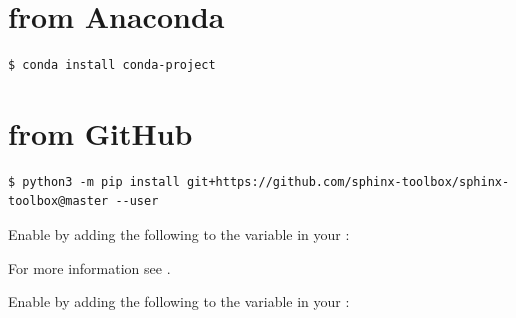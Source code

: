 \documentclass[letterpaper,10pt,english]{sphinxmanual}
\begin{document}
\chapter{from Anaconda}
\label{\detokenize{installation:installation-17-from_Anaconda}}
\begin{Verbatim}[commandchars=\\\{\}]
$ conda install conda-project
\end{Verbatim}


\chapter{from GitHub}
\label{\detokenize{installation:installation-17-from_GitHub}}
\begin{Verbatim}[commandchars=\\\{\}]
$ python3 -m pip install git+https://github.com/sphinx-toolbox/sphinx-toolbox@master --user
\end{Verbatim}

\label{\detokenize{installation:extensions-0}}

\vspace{10px}

Enable  by adding the following
to the  variable in your :

\begin{sphinxVerbatim}[commandchars=\\\{\}]
  \PYG{p}{[}
    \PYG{p}{]}
\end{sphinxVerbatim}
\begin{flushleft}
For more information see  .
\end{flushleft}

\label{\detokenize{installation:extensions-1}}

\vspace{10px}

Enable  by adding the following
to the  variable in your :
\end{document}

